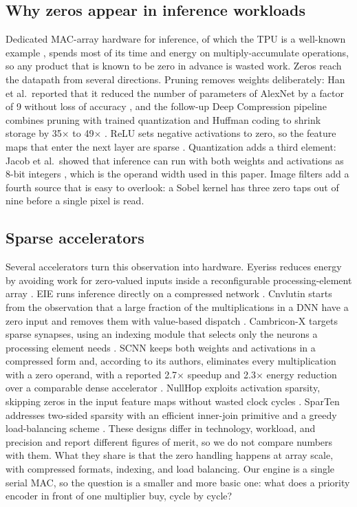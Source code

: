 \documentclass[11pt,journal,draftclsnofoot,onecolumn]{IEEEtran}
\begin{document}
\subsection{Why zeros appear in inference workloads}
Dedicated MAC-array hardware for inference, of which the TPU is a well-known example
\cite{tpu2017}, spends most of its time and energy on multiply-accumulate operations,
so any product that is known to be zero in advance is wasted work. Zeros reach the
datapath from several directions. Pruning removes weights deliberately: Han et al.\
reported that it reduced the number of parameters of AlexNet by a factor of 9 without
loss of accuracy \cite{han2015}, and the follow-up Deep Compression pipeline combines
pruning with trained quantization and Huffman coding to shrink storage by 35$\times$ to
49$\times$ \cite{deepcomp2016}. ReLU sets negative activations to zero, so the feature
maps that enter the next layer are sparse \cite{scnn2017}. Quantization adds a third
element: Jacob et al.\ showed that inference can run with both weights and activations
as 8-bit integers \cite{jacob2018}, which is the operand width used in this paper. Image
filters add a fourth source that is easy to overlook: a Sobel kernel has three zero
taps out of nine before a single pixel is read.

\subsection{Sparse accelerators}
Several accelerators turn this observation into hardware. Eyeriss reduces energy by
avoiding work for zero-valued inputs inside a reconfigurable processing-element array
\cite{eyeriss2017}. EIE runs inference directly on a compressed network
\cite{eie2016}. Cnvlutin starts from the observation that a large fraction of the
multiplications in a DNN have a zero input and removes them with value-based
dispatch \cite{cnvlutin2016}. Cambricon-X targets sparse synapses, using an indexing
module that selects only the neurons a processing element needs \cite{cambriconx2016}.
SCNN keeps both weights and activations in a compressed form and, according to its
authors, eliminates every multiplication with a zero operand, with a reported 2.7$\times$
speedup and 2.3$\times$ energy reduction over a comparable dense accelerator
\cite{scnn2017}. NullHop exploits activation sparsity, skipping zeros in the input
feature maps without wasted clock cycles \cite{nullhop2019}. SparTen addresses
two-sided sparsity with an efficient inner-join primitive and a greedy load-balancing
scheme \cite{sparten2019}. These designs differ in technology, workload, and precision
and report different figures of merit, so we do not compare numbers with them. What they
share is that the zero handling happens at array scale, with compressed formats,
indexing, and load balancing. Our engine is a single serial MAC, so the question is a
smaller and more basic one: what does a priority encoder in front of one multiplier buy,
cycle by cycle?
\end{document}
